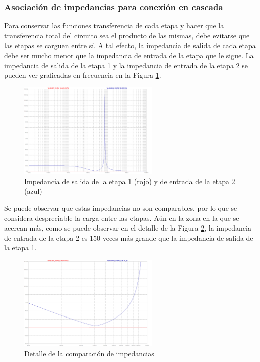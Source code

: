\documentclass[spanish]{article}
\begin{document}
\subsubsection{Asociación de impedancias para conexión en cascada}
Para conservar las funciones transferencia de cada etapa y hacer que la transferencia total del circuito sea el producto de las mismas, debe evitarse que las etapas se carguen entre sí. A tal efecto, la impedancia de salida de cada etapa debe ser mucho menor que la impedancia de entrada de la etapa que le sigue. La impedancia de salida de la etapa 1 y la impedancia de entrada de la etapa 2 se pueden ver graficadas en frecuencia en la Figura \ref{imptodo}.

\begin{figure}[H]
    \centering
    \includegraphics[width=0.6\textwidth]{Resources/imptodo.png}
    \caption{Impedancia de salida de la etapa 1 (rojo) y de entrada de la etapa 2 (azul)}
    \label{imptodo}
\end{figure}

Se puede observar que estas impedancias no son comparables, por lo que se considera despreciable la carga entre las etapas. Aún en la zona en la que se acercan más, como se puede observar en el detalle de la Figura \ref{impdetalle}, la impedancia de entrada de la etapa 2 es 150 veces más grande que la impedancia de salida de la etapa 1.

\begin{figure}[H]
    \centering
    \includegraphics[width=0.6\textwidth]{Resources/impdetalle.png}
    \caption{Detalle de la comparación de impedancias}
    \label{impdetalle}
\end{figure}
\end{document}
